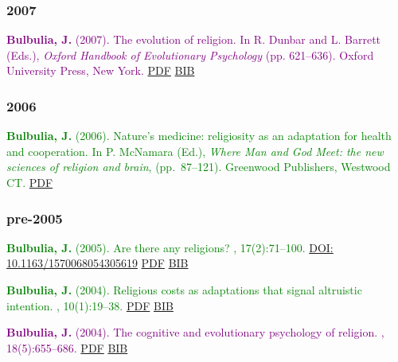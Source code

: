 \documentclass{article}
\begin{document}
\begin{thebibliography}{99}
\subsubsection*{2007}



\textcolor{Purple}{
{\bf Bulbulia, J.} (2007).
\newblock The evolution of religion.
\newblock In R. Dunbar and L. Barrett (Eds.), {\em Oxford Handbook of
  Evolutionary Psychology} (pp. 621--636). Oxford University
  Press, New York.} \href{http://db.tt/nSs5qqb}{PDF} \href{https://www.dropbox.com/s/owcmsyw09umhc1x/theEvoReligion.bib?dl=0}{BIB}


\subsubsection*{2006}
\textcolor{Green}{
{\bf Bulbulia, J.} (2006).
\newblock Nature's medicine: religiosity as an adaptation for health and
  cooperation.
\newblock In P. McNamara (Ed.), {\em Where Man and God Meet: the new
  sciences of religion and brain}, (pp.~87--121). Greenwood
  Publishers, Westwood CT.} \href{http://db.tt/HFNrN38}{PDF}



\subsubsection*{pre-2005}



\textcolor{Green}{
{\bf Bulbulia, J.} (2005).
\newblock Are there any religions?
, 17(2):71--100. 
\href{https://doi.org/10.1163/1570068054305619}{DOI: 10.1163/1570068054305619}} \href{http://db.tt/IUco0fj}{PDF} \href{https://scholar.google.co.nz/scholar.bib?q=info:VkW9oOZSmf8J:scholar.google.com/&output=citation&scisig=AAGBfm0AAAAAVQSb1HVG338RqWQkIIV6dbi-5mWgu0GN&scisf=4&hl=en}{BIB}


 \textcolor{Green}{
{\bf Bulbulia, J.} (2004).
\newblock Religious costs as adaptations that signal altruistic intention.
, 10(1):19--38.}   \href{http://db.tt/BCahAsL}{PDF} \href{https://scholar.google.co.nz/scholar.bib?q=info:S_Eaz9FFNg4J:scholar.google.com/&output=citation&scisig=AAGBfm0AAAAAVQScQ3OHzAiiRCA0uahLpFkCTVIuvpok&scisf=4&hl=en}{BIB}


\textcolor{Purple}{{\bf Bulbulia, J.} (2004).
\newblock The cognitive and evolutionary psychology of religion.
, 18(5):655--686.} \href{http://db.tt/QyYditX}{PDF} \href{https://scholar.google.co.nz/scholar.bib?q=info:wfjh1TV9XQsJ:scholar.google.com/&output=citation&scisig=AAGBfm0AAAAAVQSiEyp4iOATTHZI5hVnJLq3P73FdO1P&scisf=4&hl=en}{BIB}



\end{thebibliography}
\end{document}
